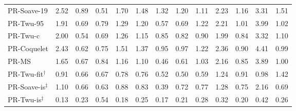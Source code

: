 \begin{table}[H]
\begin{tabular}{lcccccccccccc}
PR-Soave-19 & 2.52 & 0.89 & 0.51 & 1.70 & 1.48 & 1.32 & 1.20 & 1.11 & 2.23 & 1.16 & 3.31 & 1.51 \\
PR-Twu-95 & 1.91 & 0.69 & 0.79 & 1.29 & 1.20 & 0.57 & 0.69 & 1.22 & 2.21 & 1.01 & 3.99 & 1.02 \\
PR-Twu-c & 2.00 & 0.54 & 0.69 & 1.26 & 1.15 & 0.85 & 0.82 & 0.90 & 1.99 & 0.84 & 3.32 & 1.10 \\
PR-Coquelet & 2.43 & 0.62 & 0.75 & 1.51 & 1.37 & 0.95 & 0.97 & 1.22 & 2.36 & 0.90 & 4.41 & 0.99 \\
PR-MS & 1.65 & 0.67 & 0.84 & 1.16 & 1.10 & 0.46 & 0.61 & 1.03 & 2.16 & 0.85 & 3.89 & 1.00 \\
\midrule
PR-Twu-fit$^{\dagger}$ & 0.91 & 0.66 & 0.67 & 0.78 & 0.76 & 0.52 & 0.50 & 0.59 & 1.24 & 0.91 & 0.98 & 1.42 \\
PR-Soave-is$^{\ddagger}$ & 1.10 & 0.66 & 0.63 & 0.88 & 0.83 & 0.39 & 0.72 & 0.77 & 1.28 & 0.75 & 2.16 & 0.69 \\
PR-Twu-is$^{\ddagger}$ & 0.13 & 0.23 & 0.54 & 0.18 & 0.25 & 0.17 & 0.21 & 0.28 & 0.32 & 0.20 & 0.42 & 0.26 \\
\bottomrule
\end{tabular}
\end{table}
